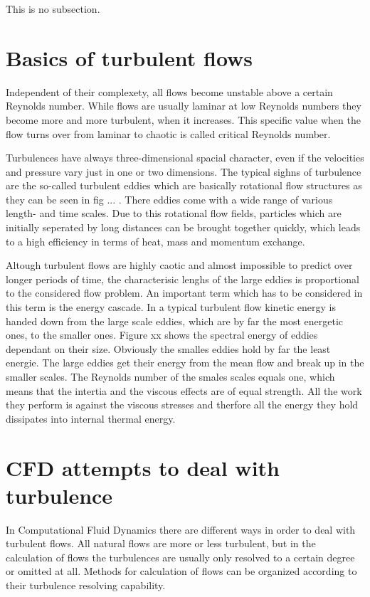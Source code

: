 This is no subsection.
\section{Basics of turbulent flows}
Independent of their complexety, all flows become unstable above a certain Reynolds number. While flows are usually laminar at low Reynolds numbers they become more and more turbulent, when it increases. This specific value when the flow turns over from laminar to chaotic is called critical Reynolds number.

Turbulences have always three-dimensional spacial character, even if the velocities and pressure vary just in one or two dimensions. The typical sighns of turbulence are the so-called turbulent eddies which are basically rotational flow structures as they can be seen in fig ... . There eddies come with a wide range of various length- and time scales. Due to this rotational flow fields, particles which are initially seperated by long distances can be brought together quickly, which leads to a high efficiency in terms of heat, mass and momentum exchange.

Altough turbulent flows are highly caotic and almost impossible to predict over longer periods of time, the characterisic lenghs of the large eddies is proportional to the considered flow problem. An important term which has to be considered in this term is the energy cascade. In a typical turbulent flow kinetic energy is handed down from the large scale eddies, which are by far the most energetic ones, to the smaller ones. Figure xx shows the spectral energy of eddies dependant on their size. Obviously the smalles eddies hold by far the least energie. The large eddies get their energy from the mean flow and break up in the smaller scales. The Reynolds number of the smales scales equals one, which means that the intertia and the viscous effects are of equal strength. All the work they perform is against the viscous stresses and therfore all the energy they hold dissipates into internal thermal energy.
\section{CFD attempts to deal with turbulence}
In Computational Fluid Dynamics there are different ways in order to deal with turbulent flows. All natural flows are more or less turbulent, but in the calculation of flows the turbulences are usually only resolved to a certain degree or omitted at all. Methods for calculation of flows can be organized according to their turbulence resolving capability.

